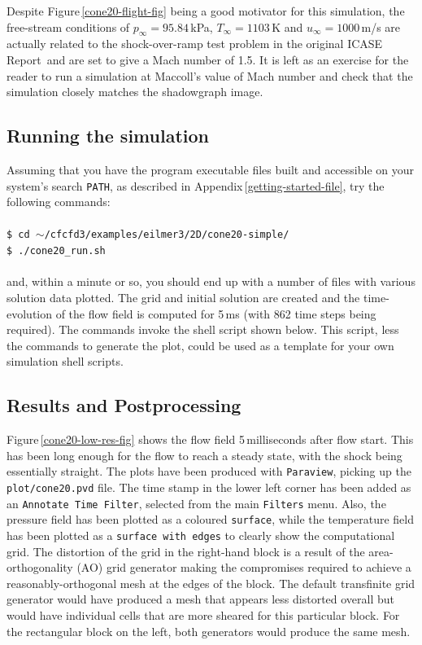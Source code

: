 \medskip
Despite Figure\,\ref{cone20-flight-fig} being a good motivator for this simulation,
the free-stream conditions of $p_{\infty} = 95.84$\,kPa, $T_{\infty} = 1103$\,K
and $u_{\infty} = 1000$\,m/s are actually related to the shock-over-ramp test problem
in the original ICASE Report\,\cite{jacobs_91d} and are set to give a Mach number of 1.5.
It is left as an exercise for the reader to run a simulation at Maccoll's value of
Mach number and check that the simulation closely matches the shadowgraph image.


\subsection{Running the simulation}
%
Assuming that you have the program executable files built and
accessible on your system's search \texttt{PATH}, as described in Appendix\,\ref{getting-started-file},
try the following commands:\\
%
\topbar\\
\texttt{\$ cd $\sim$/cfcfd3/examples/eilmer3/2D/cone20-simple/}\\
\texttt{\$ ./cone20\_run.sh}\\
\bottombar\\
%
and, within a minute or so, you should end up with a number of files
with various solution data plotted.
The grid and initial solution are created and the time-evolution of the
flow field is computed for 5\,ms (with 862 time steps being required).
The commands invoke the shell script shown below.
This script, less the commands to generate the plot, could be used as
a template for your own simulation shell scripts.

\noindent \topbar

\bottombar

\subsection{Results and Postprocessing}
%
Figure\,\ref{cone20-low-res-fig} shows the flow field 5\,milliseconds after flow start.
This has been long enough for the flow to reach a steady state, with the shock being essentially straight.
The plots have been produced with \verb!Paraview!, picking up the \verb!plot/cone20.pvd! file.
The time stamp in the lower left corner has been added as an \verb!Annotate Time Filter!, 
selected from the main \verb!Filters! menu.
Also, the pressure field has been plotted as a coloured \verb!surface!, 
while the temperature field has been plotted as a \verb!surface with edges!
to clearly show the computational grid.
The distortion of the grid in the right-hand block is a result of the area-orthogonality (AO) grid generator
making the compromises required to achieve a reasonably-orthogonal mesh at the edges of the block.
The default transfinite grid generator would have produced a mesh that appears less distorted
overall but would have individual cells that are more sheared for this particular block.
For the rectangular block on the left, both generators would produce the same mesh.

